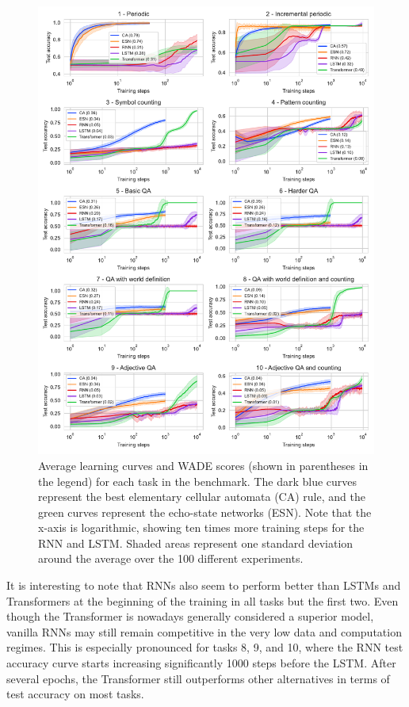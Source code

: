 \begin{figure}[htbp]
  \centering
  \includegraphics[width=.98\linewidth]{figures/all_metrics_new.pdf}
  \caption{Average learning curves and WADE scores (shown in parentheses in the
    legend) for each task in the benchmark. The dark blue curves represent the
    best elementary cellular automata (CA) rule, and the green curves represent
    the echo-state networks (ESN). Note that the x-axis is logarithmic, showing
    ten times more training steps for the RNN and LSTM. Shaded areas represent
    one standard deviation around the average over the 100 different
    experiments.}
  \label{fig:all_metrics}
\end{figure}

It is interesting to note that RNNs also seem to perform better than LSTMs and
Transformers at the beginning of the training in all tasks but the first two.
Even though the Transformer is nowadays generally considered a superior model,
vanilla RNNs may still remain competitive in the very low data and computation
regimes. This is especially pronounced for tasks 8, 9, and 10, where the RNN
test accuracy curve starts increasing significantly 1000 steps before the LSTM.
After several epochs, the Transformer still outperforms other alternatives in
terms of test accuracy on most tasks.

